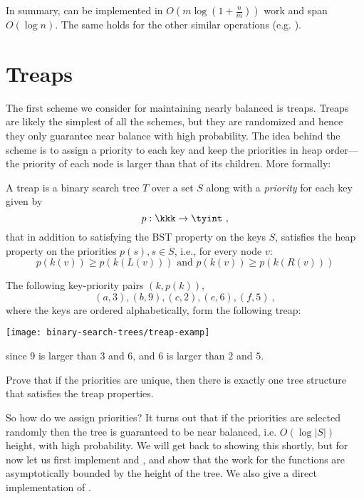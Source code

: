 In summary, \cunion{} can be implemented in $O(m \log (1 +
\tfrac{n}m))$ work and span $O(\log n)$.  The same holds for the other
similar operations (e.g. ).

\section{Treaps}

The first scheme we consider for maintaining nearly balanced is
treaps.  Treaps are likely the simplest of all the schemes, but they
are randomized and hence they only guarantee near balance with high
probability.  The idea behind the scheme is to assign a priority to
each key and keep the priorities in heap order---the priority of each
node is larger than that of its children.  More formally:

\begin{definition}[Treap]
A treap is a binary search tree $T$ over a set $S$ along with 
a \emph{priority} for each key given by \[p : \kkk \rightarrow \tyint~,\] that
in addition to satisfying the BST property on the keys $S$, satisfies the 
heap property on the priorities $p(s), s \in S$, i.e., for every node $v$:
\[p(k(v)) \geq p(k(L(v))) \mbox{ and } p(k(v)) \geq p(k(R(v)))\]
\end{definition}

\begin{example}
The following key-priority pairs $(k,p(k))$, 
\[ (a,3), (b,9), (c, 2), (e,6), (f, 5)~,\] where the keys are ordered
alphabetically, form the following treap:
\begin{center}
  \texttt{[image: binary-search-trees/treap-examp]}
\end{center}
since $9$ is larger than $3$ and $6$, and $6$ is larger than $2$ and
$5$.
\end{example}
\begin{exercise}
Prove that if the priorities are unique, then there is exactly one tree
structure that satisfies the treap properties.
\end{exercise}

So how do we assign priorities?  It turns out that if the priorities are
selected randomly then the tree is guaranteed to be near balanced,
i.e. $O(\log |S|)$ height, with high probability.  We will get back to
showing this shortly, but for now let us first implement 
and , and show that the work for the functions
are asymptotically bounded by the height of the tree.  We 
also give a direct implementation of .

